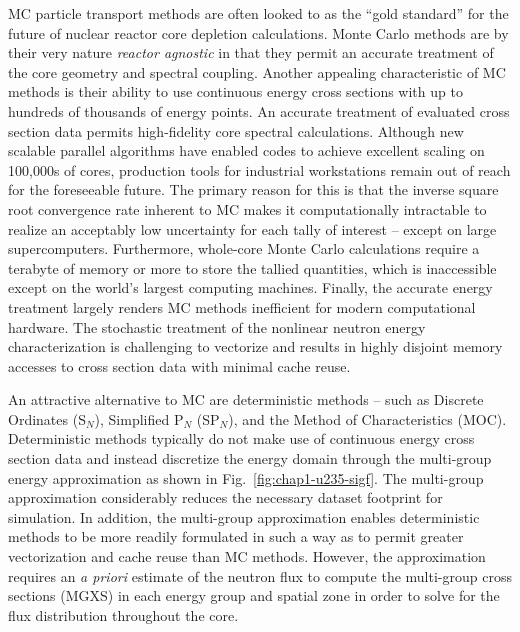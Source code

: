 
\ac{MC} particle transport methods are often looked to as the ``gold standard'' for the future of nuclear reactor core depletion calculations. Monte Carlo methods are by their very nature \textit{reactor agnostic} in that they permit an accurate treatment of the core geometry and spectral coupling. Another appealing characteristic of \ac{MC} methods is their ability to use continuous energy cross sections with up to hundreds of thousands of energy points. An accurate treatment of evaluated cross section data permits high-fidelity core spectral calculations. Although new scalable parallel algorithms have enabled codes to achieve excellent scaling on 100,000s of cores, production tools for industrial workstations remain out of reach for the foreseeable future. The primary reason for this is that the inverse square root convergence rate inherent to \ac{MC} makes it computationally intractable to realize an acceptably low uncertainty for each tally of interest -- except on large supercomputers. Furthermore, whole-core Monte Carlo calculations require a terabyte of memory or more to store the tallied quantities, which is inaccessible except on the world's largest computing machines. Finally, the accurate energy treatment largely renders \ac{MC} methods inefficient for modern computational hardware. The stochastic treatment of the nonlinear neutron energy characterization is challenging to vectorize and results in highly disjoint memory accesses to cross section data with minimal cache reuse. 

An attractive alternative to MC are deterministic methods -- such as Discrete Ordinates (S$_N$), Simplified P$_N$ (SP$_N$), and the Method of Characteristics (MOC). Deterministic methods typically do not make use of continuous energy cross section data and instead discretize the energy domain through the multi-group energy approximation as shown in Fig.~\ref{fig:chap1-u235-sigf}. The multi-group approximation considerably reduces the necessary dataset footprint for simulation. In addition, the multi-group approximation enables deterministic methods to be more readily formulated in such a way as to permit greater vectorization and cache reuse than \ac{MC} methods. However, the approximation requires an \textit{a priori} estimate of the neutron flux to compute the multi-group cross sections (MGXS) in each energy group and spatial zone in order to solve for the flux distribution throughout the core.

